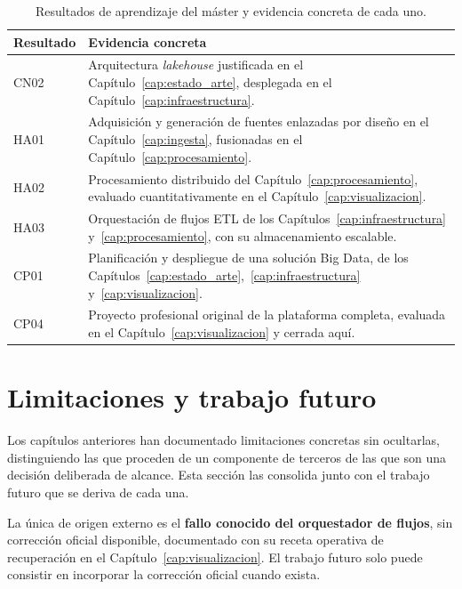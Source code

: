 \begin{table}[H]
  \centering
  \footnotesize
  \renewcommand{\arraystretch}{1.05}
  \begin{tabular}{
    p{}
    >{\raggedright\arraybackslash}p{}}
    \hline
    \textbf{Resultado} & \textbf{Evidencia concreta} \\
    \hline
    CN02 & Arquitectura \textit{lakehouse} justificada en el
    Capítulo~\ref{cap:estado_arte}, desplegada en el
    Capítulo~\ref{cap:infraestructura}. \\
    HA01 & Adquisición y generación de fuentes enlazadas por diseño en el
    Capítulo~\ref{cap:ingesta}, fusionadas en el
    Capítulo~\ref{cap:procesamiento}. \\
    HA02 & Procesamiento distribuido del Capítulo~\ref{cap:procesamiento},
    evaluado cuantitativamente en el Capítulo~\ref{cap:visualizacion}. \\
    HA03 & Orquestación de flujos ETL de los
    Capítulos~\ref{cap:infraestructura} y~\ref{cap:procesamiento}, con su
    almacenamiento escalable. \\
    CP01 & Planificación y despliegue de una solución Big Data, de los
    Capítulos~\ref{cap:estado_arte},~\ref{cap:infraestructura}
    y~\ref{cap:visualizacion}. \\
    CP04 & Proyecto profesional original de la plataforma completa,
    evaluada en el Capítulo~\ref{cap:visualizacion} y cerrada aquí. \\
    \hline
  \end{tabular}
  \caption{Resultados de aprendizaje del máster y evidencia concreta de cada uno.}
  \label{tab:tfm_conclusiones_outcomes}
\end{table}

\section{Limitaciones y trabajo futuro}
\label{sec:conclusiones_limitaciones}

Los capítulos anteriores han documentado limitaciones concretas sin
ocultarlas, distinguiendo las que proceden de un componente de terceros de
las que son una decisión deliberada de alcance. Esta sección las
consolida junto con el trabajo futuro que se deriva de cada una.

La única de origen externo es el \textbf{fallo conocido del orquestador de
flujos}, sin corrección oficial disponible, documentado con su receta
operativa de recuperación en el Capítulo~\ref{cap:visualizacion}. El
trabajo futuro solo puede consistir en incorporar la corrección oficial
cuando exista.

